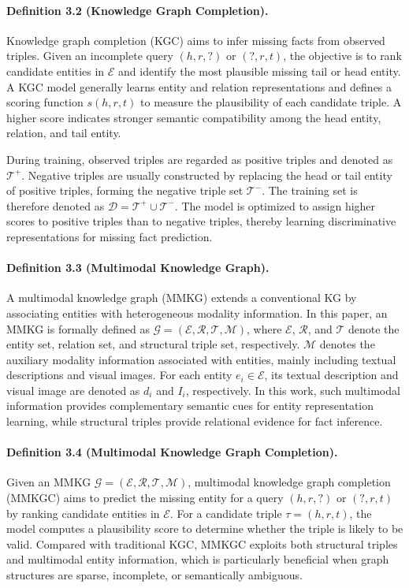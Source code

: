 \documentclass[a4paper,fleqn]{cas-sc}
\begin{document}
\paragraph{Definition 3.2 (Knowledge Graph Completion).}
Knowledge graph completion (KGC) aims to infer missing facts from observed triples. Given an incomplete query $(h,r,?)$ or $(?,r,t)$, the objective is to rank candidate entities in $\mathcal{E}$ and identify the most plausible missing tail or head entity. A KGC model generally learns entity and relation representations and defines a scoring function $s(h,r,t)$ to measure the plausibility of each candidate triple. A higher score indicates stronger semantic compatibility among the head entity, relation, and tail entity.

During training, observed triples are regarded as positive triples and denoted as $\mathcal{T}^{+}$. Negative triples are usually constructed by replacing the head or tail entity of positive triples, forming the negative triple set $\mathcal{T}^{-}$. The training set is therefore denoted as $\mathcal{D}=\mathcal{T}^{+}\cup\mathcal{T}^{-}$. The model is optimized to assign higher scores to positive triples than to negative triples, thereby learning discriminative representations for missing fact prediction.

\paragraph{Definition 3.3 (Multimodal Knowledge Graph).}
A multimodal knowledge graph (MMKG) extends a conventional KG by associating entities with heterogeneous modality information. In this paper, an MMKG is formally defined as
$\mathcal{G}=(\mathcal{E},\mathcal{R},\mathcal{T},\mathcal{M})$,
where $\mathcal{E}$, $\mathcal{R}$, and $\mathcal{T}$ denote the entity set, relation set, and structural triple set, respectively. $\mathcal{M}$ denotes the auxiliary modality information associated with entities, mainly including textual descriptions and visual images. For each entity $e_i\in\mathcal{E}$, its textual description and visual image are denoted as $d_i$ and $I_i$, respectively. In this work, such multimodal information provides complementary semantic cues for entity representation learning, while structural triples provide relational evidence for fact inference.

\paragraph{Definition 3.4 (Multimodal Knowledge Graph Completion).}
Given an MMKG $\mathcal{G}=(\mathcal{E},\mathcal{R},\mathcal{T},\mathcal{M})$, multimodal knowledge graph completion (MMKGC) aims to predict the missing entity for a query $(h,r,?)$ or $(?,r,t)$ by ranking candidate entities in $\mathcal{E}$. For a candidate triple $\tau=(h,r,t)$, the model computes a plausibility score to determine whether the triple is likely to be valid. Compared with traditional KGC, MMKGC exploits both structural triples and multimodal entity information, which is particularly beneficial when graph structures are sparse, incomplete, or semantically ambiguous.
\end{document}
